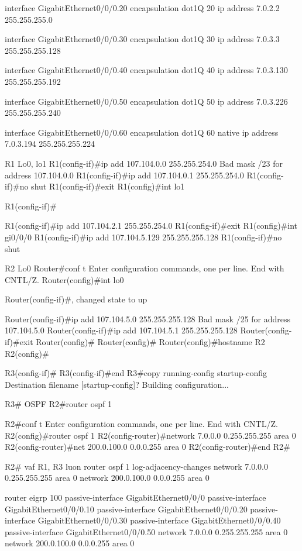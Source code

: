 \documentclass[13pt]{article}
\begin{document}
interface GigabitEthernet0/0/0.20
 encapsulation dot1Q 20
 ip address 7.0.2.2 255.255.255.0

interface GigabitEthernet0/0/0.30
 encapsulation dot1Q 30
 ip address 7.0.3.3 255.255.255.128

interface GigabitEthernet0/0/0.40
 encapsulation dot1Q 40
 ip address 7.0.3.130 255.255.255.192

interface GigabitEthernet0/0/0.50
 encapsulation dot1Q 50
 ip address 7.0.3.226 255.255.255.240

interface GigabitEthernet0/0/0.60
 encapsulation dot1Q 60 native
 ip address 7.0.3.194 255.255.255.224



R1 Lo0, lo1
R1(config-if)#ip add 107.104.0.0 255.255.254.0
Bad mask /23 for address 107.104.0.0
R1(config-if)#ip add 107.104.0.1 255.255.254.0
R1(config-if)#no shut
R1(config-if)#exit
R1(config)#int lo1

R1(config-if)#

R1(config-if)#ip add 107.104.2.1 255.255.254.0
R1(config-if)#exit
R1(config)#int gi0/0/0
R1(config-if)#ip add 107.104.5.129 255.255.255.128
R1(config-if)#no shut


R2 Lo0
Router#conf t
Enter configuration commands, one per line.  End with CNTL/Z.
Router(config)#int lo0

Router(config-if)#, changed state to up

Router(config-if)#ip add 107.104.5.0 255.255.255.128
Bad mask /25 for address 107.104.5.0
Router(config-if)#ip add 107.104.5.1 255.255.255.128
Router(config-if)#exit
Router(config)#
Router(config)#
Router(config)#hostname R2
R2(config)#

R3(config-if)#
R3(config-if)#end
R3#copy running-config startup-config
Destination filename [startup-config]? 
Building configuration...


R3#
OSPF
R2#router ospf 1

R2#conf t
Enter configuration commands, one per line.  End with CNTL/Z.
R2(config)#router ospf 1
R2(config-router)#network 7.0.0.0 0.255.255.255 area 0
R2(config-router)#net 200.0.100.0 0.0.0.255 area 0
R2(config-router)#end
R2#

R2# vaf R1, R3 luon
router ospf 1
 log-adjacency-changes
 network 7.0.0.0 0.255.255.255 area 0
 network 200.0.100.0 0.0.0.255 area 0

router eigrp 100
 passive-interface GigabitEthernet0/0/0
 passive-interface GigabitEthernet0/0/0.10
 passive-interface GigabitEthernet0/0/0.20
 passive-interface GigabitEthernet0/0/0.30
 passive-interface GigabitEthernet0/0/0.40
 passive-interface GigabitEthernet0/0/0.50
 network 7.0.0.0 0.255.255.255 area 0
 network 200.0.100.0 0.0.0.255 area 0
\end{document}
